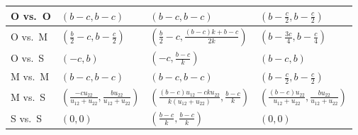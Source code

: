 \documentclass[11pt,reqno]{amsart}
\newcommand{\bn}{b} %
\newcommand{\cs}{c} %
\newcommand{\vh}{k} %
\begin{document}
\begin{table}[htbp]
\begin{tabular}{@{}llll@{}}
O vs.~O              & $(\bn -\cs, \bn -\cs)$                                                                                                           & $(\bn -\cs, \bn -\cs)$                                                                                                              & $(\bn -\frac{\cs}{2}, \bn - \frac{\cs}{2})$                                                                                         \\ \midrule
O vs.~M              & $(\frac{\bn}{2} - \cs, \bn - \frac{\cs}{2})$                                                                                     & $(\frac{\bn}{2} - \cs,\frac{(\bn - \cs)\vh+\bn - \cs}{2\vh})$                                                                       & $(\bn -\frac{3\cs}{4},\bn -\frac{\cs}{4})$                                                                                          \\ \midrule
O vs.~S              & $(-\cs, \bn)$                                                                                                                    & $(- \cs, \frac{\bn - \cs}{\vh})$                                                                                                    & $(\bn -\cs, \bn)$                                                                                                                   \\ \midrule
M vs.~M              & $(\bn -\cs, \bn -\cs)$                                                                                                           & $(\bn -\cs, \bn -\cs)$                                                                                                              & $(\bn -\frac{\cs}{2}, \bn - \frac{\cs}{2})$                                                                                         \\ \midrule
M vs.~S              & $(\frac{-\cs u_{22}}{u_{12}+u_{22}},\frac{\bn u_{22}}{u_{12}+u_{22}})$                                                           & $(\frac{(\bn - \cs)u_{12} - \cs\vh u_{22}}{\vh(u_{12}+u_{22})},\frac{\bn - \cs}{\vh})$                                              & $(\frac{(\bn-\cs) u_{22}}{u_{12}+u_{22}},\frac{\bn u_{22}}{u_{12}+u_{22}})$                                                         \\ \midrule
S vs.~S              & $(0,0)$                                                                                                                          & $(\frac{\bn - \cs}{\vh}, \frac{\bn - \cs}{\vh})$                                                                                    & $(0,0)$                                                                                                                             \\ \bottomrule
\end{tabular}
\end{table}
\end{document}
